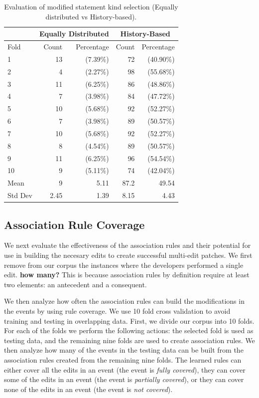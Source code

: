 \documentclass[sigconf]{acmart}
\newcommand{\todo}[1]
  {{\scriptsize \textbf{\color{red} {#1}}}}
\begin{document}
\begin{table}[]
\centering
\caption{Evaluation of modified statement kind selection (Equally distributed vs History-based).}
\label{10FoldEDvsHB}
\begin{tabular}{l|rr|rr}
\toprule
   &   \multicolumn{2}{c|}{ Equally Distributed}   &   \multicolumn{2}{|c}{ History-Based} \\
\midrule
Fold  &   Count & Percentage  &  Count & Percentage  \\
\midrule
1&13&(7.39\%) & 72&(40.90\%) \\
2&4&(2.27\%) & 98&(55.68\%) \\
3&11&(6.25\%) & 86&(48.86\%) \\
4&7&(3.98\%) & 84&(47.72\%) \\
5&10&(5.68\%) & 92&(52.27\%) \\
6&7&(3.98\%) & 89&(50.57\%) \\
7&10&(5.68\%) & 92&(52.27\%) \\
8&8&(4.54\%) & 89&(50.57\%) \\
9&11&(6.25\%) & 96&(54.54\%) \\
10&9&(5.11\%) & 74&(42.04\%) \\
\bottomrule
Mean &9 & 5.11 & 87.2 & 49.54 \\
\bottomrule
Std Dev & 2.45 & 1.39 & 8.15 & 4.43 \\
\bottomrule

\end{tabular}
\end{table}



\subsection{Association Rule Coverage}

We next evaluate the effectiveness
of the association rules and their potential for use in building the
necesary edits to create successful multi-edit patches. We first
remove from our corpus the instances where the developers
performed a single edit.\todo{how many?} This is because association rules
by definition require at least two elements: an antecedent
and a consequent. 

We then analyze how often the association rules can build the 
modifications in the events by using rule coverage. We use 10 fold cross validation to avoid training and testing in overlapping data.
First, we divide our corpus into 10 folds.
For each of the folds we perform the following actions:
the selected fold is used as testing data, and the
remaining nine folds are used to create association rules.
We then analyze how many of the events in the testing data
can be built from the association 
rules created from the remaining nine folds.
The learned rules can either cover all the edits in an event (the 
event is \emph{fully covered}), they can cover some of the edits in an 
event (the event is \emph{partially covered}), or they can cover none of
the edits in an event (the event is \emph{not covered}).
\end{document}
